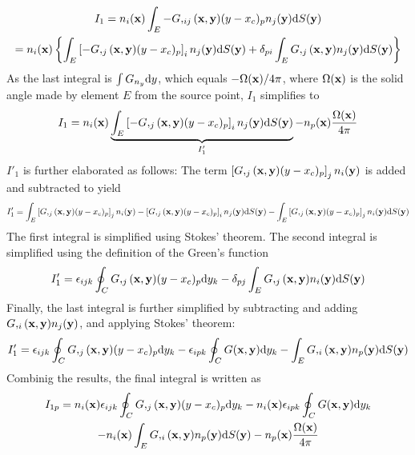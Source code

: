 \begin{multline}
	I_1
	= n_i({\bf x}) \int_E -G,_{ij}({\bf x}, {\bf y}) 
	(y - x_c)_p
	n_j({\bf y})
	\mathrm{d} S({\bf y}) \\
	= n_i({\bf x})
	\left\{ \int_E \left[-G,_{j}({\bf x}, {\bf y}) 
	(y - x_c)_p\right]_i
	n_j({\bf y})
	\mathrm{d} S({\bf y})
	+
	\delta_{pi}
	\int_E G,_{j}({\bf x}, {\bf y}) 
	n_j({\bf y})
	\mathrm{d} S({\bf y})
	\right\}
\end{multline}
%
As the last integral is $\int G_{n_y} \mathrm{d} y$, which equals $-\Omega({\bf x})/4\pi$, where $\Omega({\bf x})$ is the solid angle made by element $E$ from the source point, $I_1$ simplifies to
%
\begin{equation}
	I_1
	= 
	n_i({\bf x})
	\underbrace{\int_E
	\left[-G,_{j}({\bf x}, {\bf y}) 
	(y - x_c)_p\right]_i
	n_j({\bf y})
	\mathrm{d} S({\bf y})}_{I'_1}
	-
	n_p({\bf x})
	\frac{\Omega({\bf x})}{4\pi}
\end{equation}
%
$I'_1$ is further elaborated as follows: The term $\left[G,_{j}({\bf x}, {\bf y}) (y - x_c)_p\right]_j n_i({\bf y})$ is added and subtracted to yield
%
\begin{equation}
	I'_1 = 
	\int_E
	\left[G,_{j}({\bf x}, {\bf y}) (y - x_c)_p\right]_j
	n_i({\bf y})
	-
	\left[G,_{j}({\bf x}, {\bf y}) (y - x_c)_p\right]_i
	n_j({\bf y})
	\mathrm{d} S({\bf y})
	-
	\int_E
	\left[G,_{j}({\bf x}, {\bf y}) (y - x_c)_p\right]_j
	n_i({\bf y})
	\mathrm{d} S({\bf y})
\end{equation}
%
The first integral is simplified using Stokes' theorem. The second integral is simplified using the definition of the Green's function
%
\begin{equation}
	I'_1 = 
	\epsilon_{ijk}
	\oint_C
	G,_{j}({\bf x}, {\bf y}) (y - x_c)_p
	\mathrm{d} y_k
	-
	\delta_{pj}
	\int_E
		G,_{j}({\bf x}, {\bf y})
		n_i({\bf y})
	\mathrm{d} S({\bf y})
\end{equation}
%
Finally, the last integral is further simplified by subtracting and adding $G,_{i}({\bf x}, {\bf y}) n_j({\bf y})$, and applying Stokes' theorem:
%
\begin{equation}
	I'_1 = 
	\epsilon_{ijk}
	\oint_C
	G,_{j}({\bf x}, {\bf y}) (y - x_c)_p
	\mathrm{d} y_k
	-
	\epsilon_{ipk}
	\oint_C
		G({\bf x}, {\bf y})
	\mathrm{d} y_k
	-
	\int_E
		G,_{i}({\bf x}, {\bf y}) n_p({\bf y})
	\mathrm{d} S({\bf y})
\end{equation}
%
Combinig the results, the final integral is written as
%
\begin{multline}
	I_{1p} = 
	n_i({\bf x})
	\epsilon_{ijk}
	\oint_C
	G,_{j}({\bf x}, {\bf y}) (y - x_c)_p
	\mathrm{d} y_k
	-
	n_i({\bf x})
	\epsilon_{ipk}
	\oint_C
		G({\bf x}, {\bf y})
	\mathrm{d} y_k \\
	-
	n_i({\bf x})
	\int_E
		G,_{i}({\bf x}, {\bf y}) n_p({\bf y})
	\mathrm{d} S({\bf y})
	-
	n_p({\bf x}) \frac{\Omega({\bf x})}{4\pi}
\end{multline}
